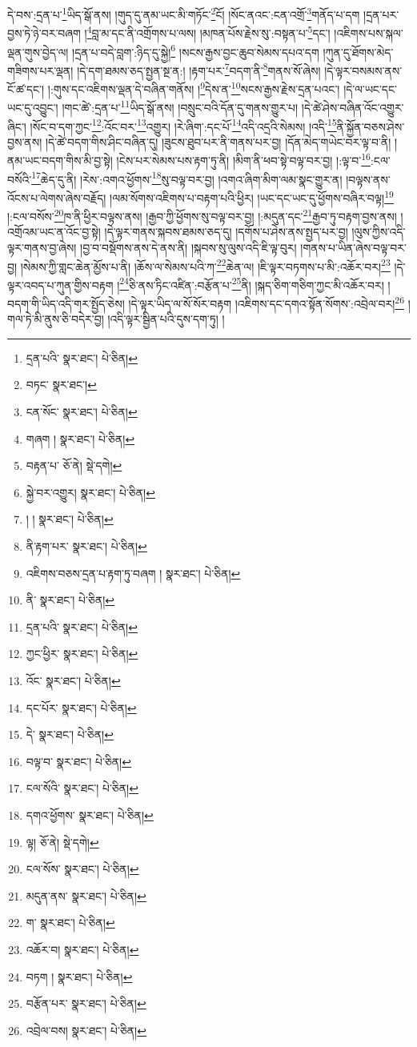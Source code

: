 དེ་བས་:དྲན་པ་\footnote{དྲན་པའི་  སྣར་ཐང་།  པེ་ཅིན། }ཡིད་སྒོ་ནས། །གུད་དུ་ནམ་ཡང་མི་གཏོང་\footnote{བཏང་  སྣར་ཐང་། }ངོ། །སོང་ནའང་:ངན་འགྲོ་\footnote{ངན་སོང་  སྣར་ཐང་།  པེ་ཅིན། }གནོད་པ་དག །དྲན་པར་བྱས་ཏེ་ཉེ་བར་བཞག །\footnote{གཞག །  སྣར་ཐང་།  པེ་ཅིན། }བླ་མ་དང་ནི་འགྲོགས་པ་ལས། །མཁན་པོས་རྗེས་སུ་:བསྟན་པ་\footnote{བརྟན་པ་  ཅོ་ནེ།  སྡེ་དགེ། }དང་། །འཇིགས་པས་སྐལ་ལྡན་གུས་བྱེད་ལ། །དྲན་པ་བདེ་བླག་:ཉིད་དུ་སྐྱེ།\footnote{སྐྱེ་བར་འགྱུར།  སྣར་ཐང་།  པེ་ཅིན། } །སངས་རྒྱས་བྱང་ཆུབ་སེམས་དཔའ་དག །ཀུན་དུ་ཐོགས་མེད་གཟིགས་པར་ལྡན། །དེ་དག་ཐམས་ཅད་སྤྱན་སྔ་ན:། །རྟག་པར་\footnote{། །  སྣར་ཐང་།  པེ་ཅིན། }བདག་ནི་\footnote{ནི་རྟག་པར་  སྣར་ཐང་།  པེ་ཅིན། }གནས་སོ་ཞེས། །དེ་ལྟར་བསམས་ནས་ངོ་ཚ་དང་། །:གུས་དང་འཇིགས་ལྡན་དེ་བཞིན་གནོས། །\footnote{འཇིགས་བཅས་དྲན་པ་རྟག་ཏུ་བཞག །  སྣར་ཐང་།  པེ་ཅིན། }དེས་ན་\footnote{ནི་  སྣར་ཐང་།  པེ་ཅིན། }སངས་རྒྱས་རྗེས་དྲན་པའང་། །དེ་ལ་ཡང་དང་ཡང་དུ་འབྱུང་། །གང་ཚེ་:དྲན་པ་\footnote{དྲན་པའི་  སྣར་ཐང་།  པེ་ཅིན། }ཡིད་སྒོ་ནས། །བསྲུང་བའི་དོན་དུ་གནས་གྱུར་པ། །དེ་ཚེ་ཤེས་བཞིན་འོང་འགྱུར་ཞིང་། །སོང་བ་དག་ཀྱང་\footnote{ཀྱང་ཕྱིར་  སྣར་ཐང་།  པེ་ཅིན། }:འོང་བར་\footnote{འོང་  སྣར་ཐང་།  པེ་ཅིན། }འགྱུར། །རེ་ཞིག་:དང་པོ་\footnote{དང་པོར་  སྣར་ཐང་།  པེ་ཅིན། }འདི་འདྲའི་སེམས། །འདི་\footnote{དེ་  སྣར་ཐང་།  པེ་ཅིན། }ནི་སྐྱོན་བཅས་ཤེས་བྱས་ནས། །དེ་ཚེ་བདག་གིས་ཤིང་བཞིན་དུ། །ཟུངས་ཐུབ་པར་ནི་གནས་པར་བྱ། །དོན་མེད་གཡེང་བར་ལྟ་བ་ནི། །ནམ་ཡང་བདག་གིས་མི་བྱ་སྟེ། །ངེས་པར་སེམས་པས་རྟག་ཏུ་ནི། །མིག་ནི་ཕབ་སྟེ་བལྟ་བར་བྱ། །:ལྟ་བ་\footnote{བལྟ་བ་  སྣར་ཐང་།  པེ་ཅིན། }:ངལ་བསོའི་\footnote{ངལ་སོའི་  སྣར་ཐང་།  པེ་ཅིན། }ཆེད་དུ་ནི། །རེས་:འགའ་ཕྱོགས་\footnote{དགའ་ཕྱོགས་  སྣར་ཐང་།  པེ་ཅིན། }སུ་བལྟ་བར་བྱ། །འགའ་ཞིག་མིག་ལམ་སྣང་གྱུར་ན། །བལྟས་ནས་འོངས་པ་ལེགས་ཞེས་བརྗོད། །ལམ་སོགས་འཇིགས་པ་བརྟག་པའི་ཕྱིར། །ཡང་དང་ཡང་དུ་ཕྱོགས་བཞིར་བལྟ།\footnote{ལྟ།  ཅོ་ནེ།  སྡེ་དགེ། } །:ངལ་བསོས་\footnote{ངལ་སོས་  སྣར་ཐང་།  པེ་ཅིན། }ཁ་ནི་ཕྱིར་བལྟས་ནས། །རྒྱབ་ཀྱི་ཕྱོགས་སུ་བལྟ་བར་བྱ། །:མདུན་དང་\footnote{མདུན་ནས་  སྣར་ཐང་།  པེ་ཅིན། }རྒྱབ་ཏུ་བརྟག་བྱས་ནས། །འགྲོའམ་ཡང་ན་འོང་བྱ་སྟེ། །དེ་ལྟར་གནས་སྐབས་ཐམས་ཅད་དུ། །དགོས་པ་ཤེས་ནས་སྤྱད་པར་བྱ། །ལུས་ཀྱིས་འདི་ལྟར་གནས་བྱ་ཞེས། །བྱ་བ་བསྡོགས་ནས་དེ་ནས་ནི། །སྐབས་སུ་ལུས་འདི་ཇི་ལྟ་བུར། །གནས་པ་ཡིན་ཞེས་བལྟ་བར་བྱ། །སེམས་ཀྱི་གླང་ཆེན་མྱོས་པ་ནི། །ཆོས་ལ་སེམས་པའི་ཀ་\footnote{ག་  སྣར་ཐང་།  པེ་ཅིན། }ཆེན་ལ། །ཇི་ལྟར་བཏགས་པ་མི་:འཆོར་བར།\footnote{འཆོར་བ།  སྣར་ཐང་།  པེ་ཅིན། } །དེ་ལྟར་འབད་པ་ཀུན་གྱིས་བརྟག །\footnote{བཏག །  སྣར་ཐང་།  པེ་ཅིན། }ཅི་ནས་ཏིང་འཛིན་:བརྩོན་པ་\footnote{བརྩོན་པར་  སྣར་ཐང་།  པེ་ཅིན། }ནི། །སྐད་ཅིག་གཅིག་ཀྱང་མི་འཆོར་བར། །བདག་གི་ཡིད་འདི་གར་སྤྱོད་ཅེས། །དེ་ལྟར་ཡིད་ལ་སོ་སོར་བརྟག །འཇིགས་དང་དགའ་སྟོན་སོགས་:འབྲེལ་བར།\footnote{འབྲེལ་བས།  སྣར་ཐང་།  པེ་ཅིན། } །གལ་ཏེ་མི་ནུས་ཅི་བདེར་བྱ། །འདི་ལྟར་སྦྱིན་པའི་དུས་དག་ཏུ། །

